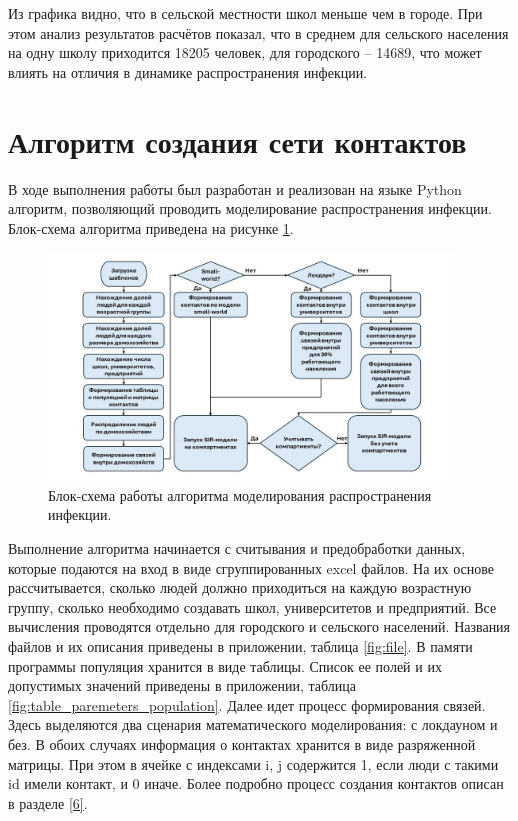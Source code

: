 \documentclass[14pt,a4paper]{article}
\begin{document}
Из графика видно, что в сельской местности школ меньше чем в городе. При этом анализ результатов расчётов показал, что в среднем для сельского населения на одну школу приходится 18205 человек, для городского – 14689, что может влиять на отличия в динамике распространения инфекции.

\newpage

\section{Алгоритм создания сети контактов}\label{7}
В ходе выполнения работы был разработан и реализован на языке Python алгоритм, позволяющий проводить моделирование распространения инфекции.
Блок-схема алгоритма приведена на рисунке \ref{fig:algo}.

\begin{figure}[h!]
	\centering
	\includegraphics[width=0.96\textwidth]{img/Алгоритм.jpg}
	\caption{Блок-схема работы алгоритма моделирования распространения инфекции.}
	\label{fig:algo}
\end{figure}
 Выполнение алгоритма начинается с считывания и предобработки данных, которые подаются на вход в виде сгруппированных excel файлов.
На их основе рассчитывается, сколько людей должно приходиться на каждую возрастную группу, сколько необходимо создавать школ, университетов и предприятий. Все вычисления проводятся отдельно для городского и сельского населений.
Названия файлов и их описания приведены в приложении, таблица \ref{fig:file}.
В памяти программы популяция хранится в виде таблицы. Список ее полей и их допустимых значений приведены в приложении, таблица \ref{fig:table_paremeters_population}.
Далее идет процесс формирования связей. Здесь выделяются два сценария математического моделирования: с локдауном и без. В обоих случаях информация о контактах хранится в виде разряженной матрицы. При этом в ячейке с индексами i, j содержится 1, если люди с такими id имели контакт, и 0 иначе. Более подробно процесс создания контактов описан в разделе \ref{6}.
\end{document}
